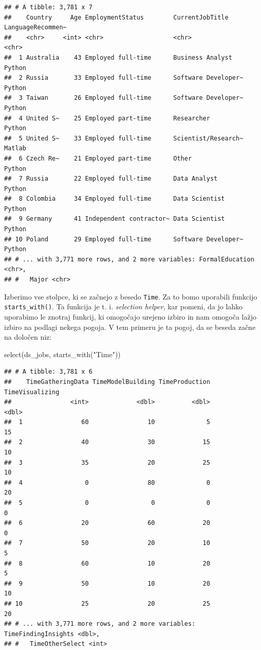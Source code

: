 \documentclass[
]{book}
\newenvironment{Shaded}{\begin{snugshade}}{\end{snugshade}}
\newcommand{\FunctionTok}[1]{\textcolor[rgb]{0.00,0.00,0.00}{#1}}
\newcommand{\NormalTok}[1]{#1}
\newcommand{\StringTok}[1]{\textcolor[rgb]{0.31,0.60,0.02}{#1}}
\begin{document}
\begin{verbatim}
## # A tibble: 3,781 x 7
##    Country     Age EmploymentStatus        CurrentJobTitle     LanguageRecommen~
##    <chr>     <int> <chr>                   <chr>               <chr>            
##  1 Australia    43 Employed full-time      Business Analyst    Python           
##  2 Russia       33 Employed full-time      Software Developer~ Python           
##  3 Taiwan       26 Employed full-time      Software Developer~ Python           
##  4 United S~    25 Employed part-time      Researcher          Python           
##  5 United S~    33 Employed full-time      Scientist/Research~ Matlab           
##  6 Czech Re~    21 Employed part-time      Other               Python           
##  7 Russia       22 Employed full-time      Data Analyst        Python           
##  8 Colombia     34 Employed full-time      Data Scientist      Python           
##  9 Germany      41 Independent contractor~ Data Scientist      Python           
## 10 Poland       29 Employed full-time      Software Developer~ Python           
## # ... with 3,771 more rows, and 2 more variables: FormalEducation <chr>,
## #   Major <chr>
\end{verbatim}

Izberimo vse stolpce, ki se začnejo z besedo \texttt{Time}. Za to bomo uporabili funkcijo \texttt{starts\_with()}. Ta funkcija je t. i. \emph{selection helper}, kar pomeni, da jo lahko uporabimo le znotraj funkcij, ki omogočajo urejeno izbiro in nam omogoča lažjo izbiro na podlagi nekega pogoja. V tem primeru je ta pogoj, da se beseda začne na določen niz:

\begin{Shaded}
\begin{Highlighting}[]
\FunctionTok{select}\NormalTok{(ds\_jobs, }\FunctionTok{starts\_with}\NormalTok{(}\StringTok{"Time"}\NormalTok{))}
\end{Highlighting}
\end{Shaded}

\begin{verbatim}
## # A tibble: 3,781 x 6
##    TimeGatheringData TimeModelBuilding TimeProduction TimeVisualizing
##                <int>             <dbl>          <dbl>           <dbl>
##  1                60                10              5              15
##  2                40                30             15              10
##  3                35                20             25              10
##  4                 0                80              0              20
##  5                 0                 0              0               0
##  6                20                60             20               0
##  7                50                20             10               5
##  8                60                10             20               5
##  9                50                10             20              10
## 10                25                20             25              20
## # ... with 3,771 more rows, and 2 more variables: TimeFindingInsights <dbl>,
## #   TimeOtherSelect <int>
\end{verbatim}
\end{document}
